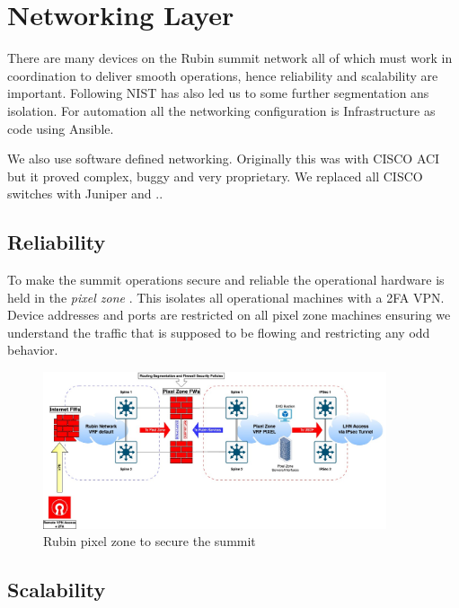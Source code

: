 \section{Networking Layer} \label{sec:networking}

There are many devices on the Rubin summit network all of which must work in coordination to deliver smooth operations, hence reliability and scalability are important.
Following NIST \citep{NIST.SP.800-171} has also led us to some further segmentation ans isolation.
For automation all the networking configuration is Infrastructure as code using Ansible.

We also use software defined networking.
Originally this was with CISCO ACI but it proved complex, buggy and very proprietary.
We replaced all CISCO switches with Juniper and ..

\subsection{Reliability}

To make the summit operations secure and reliable the operational hardware is held in the \emph{pixel zone}
.
This isolates all operational machines with a 2FA VPN.
Device addresses and ports are restricted on all pixel zone machines ensuring we understand the traffic that
is supposed to be flowing and restricting any odd behavior.

\begin{figure}
\begin{centering}
\includegraphics[width=0.9\textwidth]{images/pixel-zone}
        \caption{Rubin pixel zone to secure the summit
\label{fig:pixel-zone}}
\end{centering}
\end{figure}

\subsection{Scalability}
